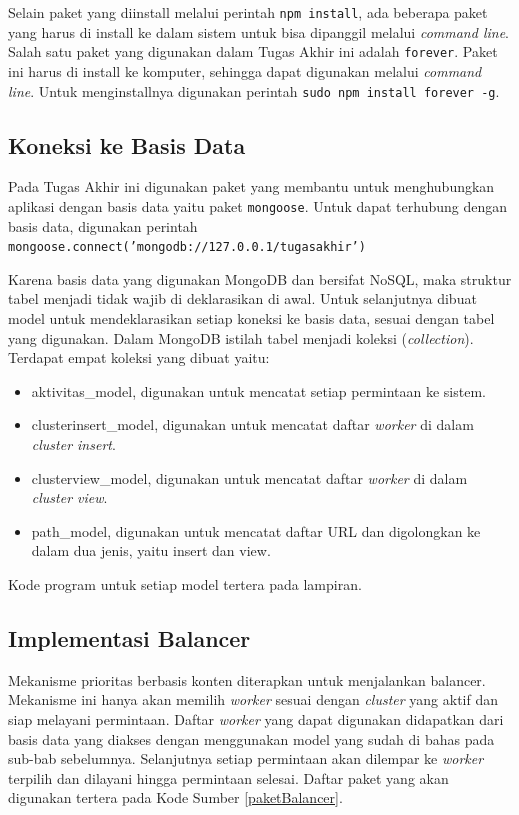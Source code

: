 \documentclass{ta-its}
\begin{document}
				Selain paket yang diinstall melalui perintah \texttt{npm install}, ada beberapa paket yang harus di install ke dalam sistem untuk bisa dipanggil melalui \textit{command line}. Salah satu paket yang digunakan dalam Tugas Akhir ini adalah \texttt{forever}. Paket ini harus di install ke komputer, sehingga dapat digunakan melalui \textit{command line}. Untuk menginstallnya digunakan perintah \texttt{sudo npm install forever -g}.
        
	        \subsection{Koneksi ke Basis Data}
		        Pada Tugas Akhir ini digunakan paket yang membantu untuk menghubungkan aplikasi dengan basis data yaitu paket \texttt{mongoose}. Untuk dapat terhubung dengan basis data, digunakan perintah \texttt{mongoose.connect('mongodb://127.0.0.1/tugasakhir')}
		        
		        Karena basis data yang digunakan MongoDB dan bersifat NoSQL, maka struktur tabel menjadi tidak wajib di deklarasikan di awal. Untuk selanjutnya dibuat model untuk mendeklarasikan setiap koneksi ke basis data, sesuai dengan tabel yang digunakan. Dalam MongoDB istilah tabel menjadi koleksi (\textit{collection}). Terdapat empat koleksi yang dibuat yaitu:
		        
		        \begin{itemize}
		        	\item aktivitas\_model, digunakan untuk mencatat setiap permintaan ke sistem.
		        	\item clusterinsert\_model, digunakan untuk mencatat daftar \textit{worker} di dalam \textit{cluster insert}.
		        	\item clusterview\_model, digunakan untuk mencatat daftar \textit{worker} di dalam \textit{cluster view}.
		        	\item path\_model, digunakan untuk mencatat daftar URL dan digolongkan ke dalam dua jenis, yaitu insert dan view.
		        \end{itemize}
		        
		        Kode program untuk setiap model tertera pada lampiran.
			
			\subsection{Implementasi Balancer}
				Mekanisme prioritas berbasis konten diterapkan untuk menjalankan balancer. Mekanisme ini hanya akan memilih \textit{worker} sesuai dengan \textit{cluster} yang aktif dan siap melayani permintaan. Daftar \textit{worker} yang dapat digunakan didapatkan dari basis data yang diakses dengan menggunakan model yang sudah di bahas pada sub-bab sebelumnya. Selanjutnya setiap permintaan akan dilempar ke \textit{worker} terpilih dan dilayani hingga permintaan selesai. Daftar paket yang akan digunakan tertera pada Kode Sumber \ref{paketBalancer}.
				
\end{document}
